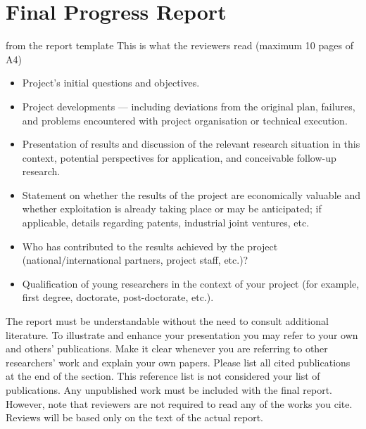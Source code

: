 \section{Final Progress Report}
\begin{todo}{from the report template}
This is what the reviewers read  (maximum 10 pages of A4)
  \begin{itemize}
  \item Project’s initial questions and objectives.
  \item Project developments --- including deviations from the original plan, failures,
    and problems encountered with project organisation or technical execution.
  \item Presentation of results and discussion of the relevant research situation in this
    context, potential perspectives for application, and conceivable follow-up research.
  \item Statement on whether the results of the project are economically valuable and whether exploitation is already taking place or may be anticipated; if applicable, details regarding patents, industrial joint ventures, etc.
  \item Who has contributed to the results achieved by the project (national/international partners, project staff, etc.)?
  \item Qualification of young researchers in the context of your project (for example, first degree, doctorate, post-doctorate, etc.).
  \end{itemize}
  The report must be understandable without the need to consult additional literature. To
  illustrate and enhance your presentation you may refer to your own and others’
  publications. Make it clear whenever you are referring to other researchers’ work and
  explain your own papers. Please list all cited publications at the end of the
  section. This reference list is not considered your list of publications. Any
  unpublished work must be included with the final report. However, note that reviewers
  are not required to read any of the works you cite. Reviews will be based only on the
  text of the actual report.
\end{todo}

